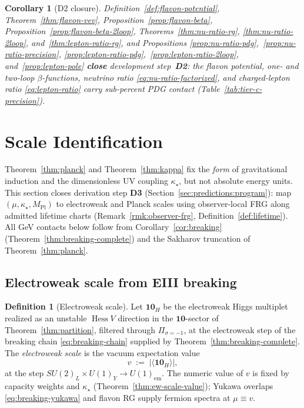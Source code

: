 \documentclass[11pt]{article}
\theoremstyle{plain}
\newtheorem{corollary}[theorem]{Corollary}
\theoremstyle{definition}
\newtheorem{definition}[theorem]{Definition}
\theoremstyle{remark}
\numberwithin{equation}{section}
\newcommand{\MPl}{M_{\mathrm{Pl}}}
\newcommand{\Hess}{\operatorname{Hess}}
\begin{document}
\begin{corollary}[D2 closure]\label{cor:flavon-d2}
Definition~\ref{def:flavon-potential}, Theorem~\ref{thm:flavon-vev},
Proposition~\ref{prop:flavon-beta},
Proposition~\ref{prop:flavon-beta-2loop}, Theorems~\ref{thm:nu-ratio-rg},
\ref{thm:nu-ratio-2loop}, and~\ref{thm:lepton-ratio-rg}, and Propositions
\ref{prop:nu-ratio-pdg},~\ref{prop:nu-ratio-precision},
\ref{prop:lepton-ratio-pdg},~\ref{prop:lepton-ratio-2loop},
and~\ref{prop:lepton-pole}
\textbf{close} development step~\textbf{D2}: the flavon potential,
one- and two-loop $\beta$-functions, neutrino ratio
\eqref{eq:nu-ratio-factorized}, and charged-lepton ratio
\eqref{eq:lepton-ratio} carry sub-percent PDG contact
(Table~\ref{tab:tier-c-precision}).
\end{corollary}%
\section{Scale Identification}
\label{sec:scales}

Theorem~\ref{thm:planck} and Theorem~\ref{thm:kappa} fix the \emph{form} of
gravitational induction and the dimensionless UV coupling $\kappa_\star$, but
not absolute energy units. This section closes derivation step \textbf{D3}
(Section~\ref{sec:predictions:program}): map $(\mu,\kappa_\star,\MPl)$ to
electroweak and Planck scales using observer-local FRG along admitted lifetime
charts (Remark~\ref{rmk:observer-frg}, Definition~\ref{def:lifetime}). All
GeV contacts below follow from Corollary~\ref{cor:breaking}
(Theorem~\ref{thm:breaking-complete}) and the Sakharov truncation of
Theorem~\ref{thm:planck}.

\subsection{Electroweak scale from EIII breaking}
\label{sec:scales:ew}

\begin{definition}[Electroweak scale]\label{def:ew-scale}
Let $\mathbf{10}_H$ be the electroweak Higgs multiplet realized as an
unstable $\Hess V$ direction in the $\mathbf{10}$-sector of
Theorem~\ref{thm:partition}, filtered through $\Pi_{\sigma=-1}$, at the
electroweak step of the breaking chain \eqref{eq:breaking-chain} supplied by
Theorem~\ref{thm:breaking-complete}. The \emph{electroweak scale} is the
vacuum expectation value
\begin{equation}\label{eq:ew-vev}
  v \;:=\; \bigl|\langle \mathbf{10}_H\rangle\bigr|,
\end{equation}
at the step $SU(2)_L\times U(1)_Y\to U(1)_{\mathrm{em}}$. The numeric value
of $v$ is fixed by capacity weights and $\kappa_\star$
(Theorem~\ref{thm:ew-scale-value}); Yukawa overlaps
\eqref{eq:breaking-yukawa} and flavon RG supply fermion spectra at $\mu\equiv v$.
\end{definition}
\end{document}
